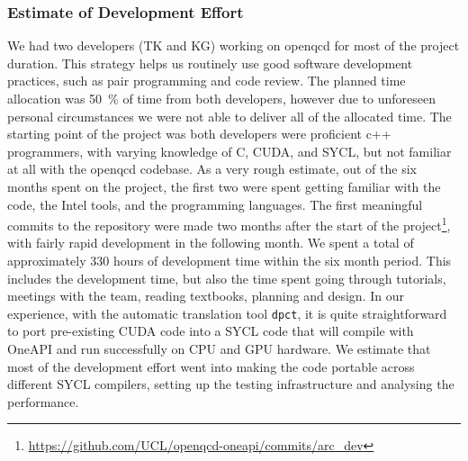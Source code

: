 \documentclass[../main]{subfiles}
\begin{document}
\subsubsection{Estimate of Development Effort}\label{sec:openqcd_personhours}

We had two developers (TK and KG) working on openqcd for most of the project duration.
This strategy helps us routinely use good software development practices, such as pair programming and code review.
The planned time allocation was 50~\% of time from both developers, however due to unforeseen personal circumstances we were not able to deliver all of the allocated time.
The starting point of the project was both developers were proficient c++ programmers, with varying knowledge of C, CUDA, and SYCL, but not familiar at all with the openqcd codebase.
As a very rough estimate, out of the six months spent on the project, the first two were spent getting familiar with the code, the Intel tools, and the programming languages.
The first meaningful commits to the repository were made two months after the start of the project\footnote{\url{https://github.com/UCL/openqcd-oneapi/commits/arc_dev}}, with fairly rapid development in the following month.
We spent a total of approximately 330 hours of development time within the six month period. This includes the development time, but also the time spent going through tutorials, meetings with the team, reading textbooks, planning and design.
In our experience, with the automatic translation tool \texttt{dpct}, it is quite straightforward to port pre-existing CUDA code into a SYCL code that will compile with OneAPI and run successfully on CPU and GPU hardware.
We estimate that most of the development effort went into making the code portable across different SYCL compilers, setting up the testing infrastructure and analysing the performance.
\end{document}
